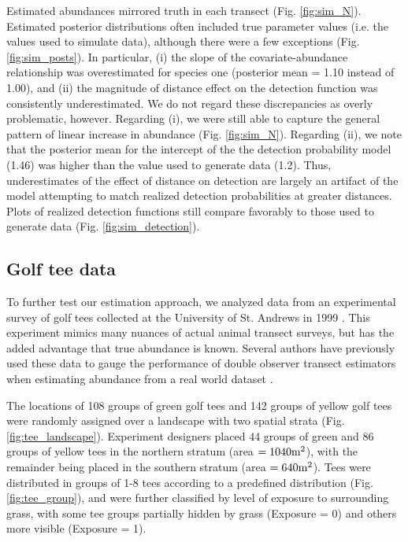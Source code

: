 \documentclass[10pt]{article}
\begin{document}
Estimated abundances mirrored truth in each transect (Fig. \ref{fig:sim_N}).  Estimated posterior distributions often included true parameter values (i.e. the values used to simulate data), although there were a few exceptions (Fig. \ref{fig:sim_posts}).  In particular, (i) the slope of the covariate-abundance relationship was overestimated for species one (posterior mean = 1.10 instead of 1.00), and (ii) the magnitude of distance effect on the detection function was consistently underestimated.  We do not regard these discrepancies as overly problematic, however. Regarding (i), we were still able to capture the general pattern of linear increase in abundance (Fig. \ref{fig:sim_N}).  Regarding (ii), we note that the posterior mean for the intercept of the the detection probability model (1.46) was higher than the value used to generate data (1.2).  Thus, underestimates of the effect of distance on detection are largely an artifact of the model attempting to match realized detection probabilities at greater distances.  Plots of realized detection functions still compare favorably to those used to generate data (Fig. \ref{fig:sim_detection}).

\subsection*{Golf tee data}

To further test our estimation approach, we analyzed data from an experimental survey of golf tees
collected at the University of St. Andrews in 1999 \cite{BorchersEtAl2002}.  This experiment mimics many nuances of actual animal transect surveys, but has the added advantage that true abundance is known.  Several authors have previously used these data to gauge the performance of double observer transect estimators when estimating abundance from a real world dataset \cite{BorchersEtAl2002,LaakeBorchers2004}.

The locations of 108 groups of green golf tees and 142 groups of yellow golf tees were randomly assigned over a landscape with two spatial strata (Fig. \ref{fig:tee_landscape}).  Experiment designers placed 44 groups of green and 86 groups of yellow tees in the northern stratum (area $=1040 {\rm m}^2$), with the remainder being placed in the southern stratum (area $=640 {\rm m}^2$).  Tees were distributed in groups of 1-8 tees according to a predefined distribution (Fig. \ref{fig:tee_group}), and were further classified by level of exposure to surrounding grass, with some tee groups partially hidden by grass (Exposure = 0) and others more visible (Exposure = 1).
\end{document}
